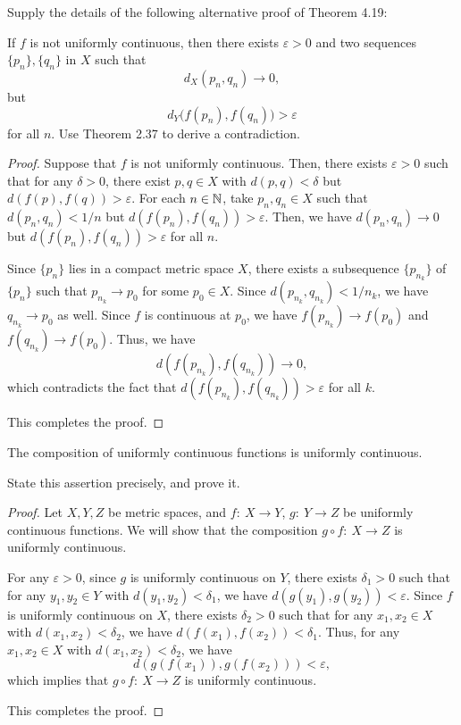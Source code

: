 \documentclass{article}
\begin{document}
\begin{problem}[4-10]
Supply the details of the following alternative proof of Theorem 4.19:

If $f$ is not uniformly continuous, then there exists $\varepsilon>0$ and two sequences $\{p_n\},\{q_n\}$ in $X$ such that
\[
d_X(p_n,q_n)\to 0,
\]
but
\[
d_Y\bigl(f(p_n),f(q_n)\bigr)>\varepsilon
\]
for all $n$.
Use Theorem 2.37 to derive a contradiction.
\end{problem}

\begin{proof}
  Suppose that \( f \) is not uniformly continuous. Then, there exists \( \varepsilon>0 \) such that for any \( \delta>0 \), there exist \( p,q\in X \) with \( d(p,q)<\delta \) but \( d(f(p),f(q))>\varepsilon \). For each \( n\in\mathbb{N} \), take \( p_n,q_n\in X \) such that \( d(p_n,q_n)<1/n \) but \( d(f(p_n),f(q_n))>\varepsilon \). Then, we have \( d(p_n,q_n)\to 0 \) but \( d(f(p_n),f(q_n))>\varepsilon \) for all \( n \).\par
  Since \( \{p_n\} \) lies in a compact metric space \( X \), there exists a subsequence \( \{p_{n_k}\} \) of \( \{p_n\} \) such that \( p_{n_k}\to p_0 \) for some \( p_0\in X \). Since \( d(p_{n_k},q_{n_k})<1/n_k \), we have \( q_{n_k}\to p_0 \) as well. Since \( f \) is continuous at \( p_0 \), we have \( f(p_{n_k})\to f(p_0) \) and \( f(q_{n_k})\to f(p_0) \). Thus, we have
  \[ d(f(p_{n_k}),f(q_{n_k}))\to 0, \]
  which contradicts the fact that \( d(f(p_{n_k}),f(q_{n_k}))>\varepsilon \) for all \( k \).\par
  This completes the proof.
\end{proof}



\begin{problem}[4-12]
The composition of uniformly continuous functions is uniformly continuous.

State this assertion precisely, and prove it.
\end{problem}

\begin{proof}
  Let \( X,Y,Z \) be metric spaces, and \( f:\ X\to Y \), \( g:\ Y\to Z \) be uniformly continuous functions. We will show that the composition \( g\circ f:\ X\to Z \) is uniformly continuous.\par
  For any \( \varepsilon>0 \), since \( g \) is uniformly continuous on \( Y \), there exists \( \delta_1>0 \) such that for any \( y_1,y_2\in Y \) with \( d(y_1,y_2)<\delta_1 \), we have \( d(g(y_1),g(y_2))<\varepsilon \). Since \( f \) is uniformly continuous on \( X \), there exists \( \delta_2>0 \) such that for any \( x_1,x_2\in X \) with \( d(x_1,x_2)<\delta_2 \), we have \( d(f(x_1),f(x_2))<\delta_1 \). Thus, for any \( x_1,x_2\in X \) with \( d(x_1,x_2)<\delta_2 \), we have
  \[ d(g(f(x_1)),g(f(x_2)))<\varepsilon, \]
  which implies that \( g\circ f:\ X\to Z \) is uniformly continuous.\par
  This completes the proof.
\end{proof}
\end{document}
